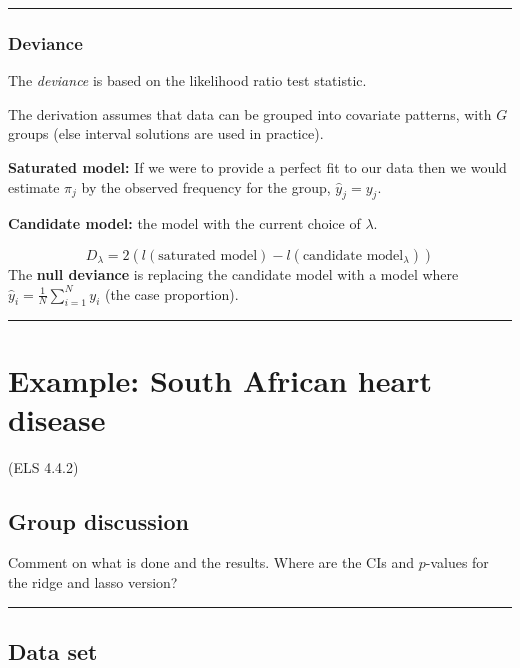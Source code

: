 \documentclass[
  letterpaper,
  DIV=11,
  numbers=noendperiod]{scrartcl}
\begin{document}
\begin{center}\rule{0.5\linewidth}{0.5pt}\end{center}

\hypertarget{deviance}{%
\subsubsection{Deviance}\label{deviance}}

The \emph{deviance} is based on the likelihood ratio test statistic.

The derivation assumes that data can be grouped into covariate patterns,
with \(G\) groups (else interval solutions are used in practice).

\textbf{Saturated model:} If we were to provide a perfect fit to our
data then we would estimate \(\pi_j\) by the observed frequency for the
group, \(\hat{y}_j=y_j\).

\textbf{Candidate model:} the model with the current choice of
\(\lambda\).

\[D_{\lambda}=2(l(\text{saturated model})-l(\text{candidate model}_{\lambda}))\]
The \textbf{null deviance} is replacing the candidate model with a model
where \(\hat{y}_i=\frac{1}{N}\sum_{i=1}^N y_i\) (the case proportion).

\begin{center}\rule{0.5\linewidth}{0.5pt}\end{center}

\hypertarget{example-south-african-heart-disease}{%
\section{Example: South African heart
disease}\label{example-south-african-heart-disease}}

(ELS 4.4.2)

\hypertarget{group-discussion}{%
\subsection{Group discussion}\label{group-discussion}}

Comment on what is done and the results. Where are the CIs and
\(p\)-values for the ridge and lasso version?

\begin{center}\rule{0.5\linewidth}{0.5pt}\end{center}

\hypertarget{data-set}{%
\subsection{Data set}\label{data-set}}
\end{document}
